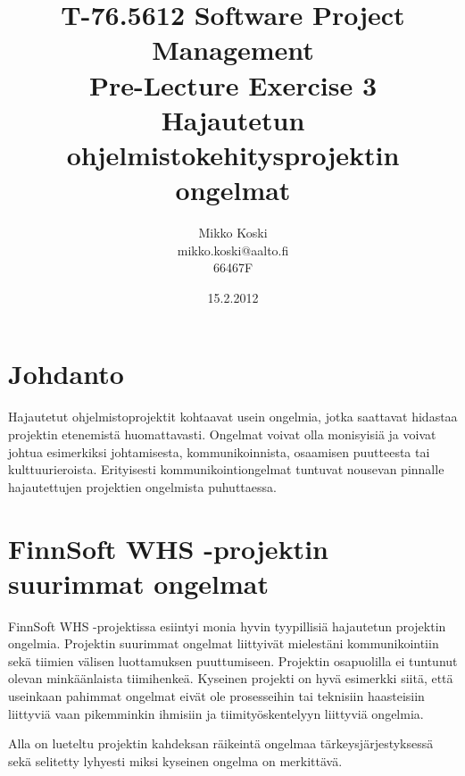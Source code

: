 \documentclass[a4paper]{article}
\begin{document}
\title{\small T-76.5612 Software Project Management \\ Pre-Lecture Exercise 3 \\ \huge Hajautetun ohjelmistokehitysprojektin ongelmat}
\date{15.2.2012}
\author{Mikko Koski \\ mikko.koski@aalto.fi \\ 66467F}
\maketitle

\normalsize

\section{Johdanto}

Hajautetut ohjelmistoprojektit kohtaavat usein ongelmia, jotka saattavat hidastaa projektin etenemistä huomattavasti. Ongelmat voivat olla monisyisiä ja voivat johtua esimerkiksi johtamisesta, kommunikoinnista, osaamisen puutteesta tai kulttuurieroista. Erityisesti kommunikointiongelmat tuntuvat nousevan pinnalle hajautettujen projektien ongelmista puhuttaessa.

\section{FinnSoft WHS -projektin suurimmat ongelmat}

FinnSoft WHS -projektissa esiintyi monia hyvin tyypillisiä hajautetun projektin ongelmia. Projektin suurimmat ongelmat liittyivät mielestäni kommunikointiin sekä tiimien välisen luottamuksen puuttumiseen. Projektin osapuolilla ei tuntunut olevan minkäänlaista tiimihenkeä. Kyseinen projekti on hyvä esimerkki siitä, että useinkaan pahimmat ongelmat eivät ole prosesseihin tai teknisiin haasteisiin liittyviä vaan pikemminkin ihmisiin ja tiimityöskentelyyn liittyviä ongelmia.

Alla on lueteltu projektin kahdeksan räikeintä ongelmaa tärkeysjärjestyksessä sekä selitetty lyhyesti miksi kyseinen ongelma on merkittävä.

\end{document}
